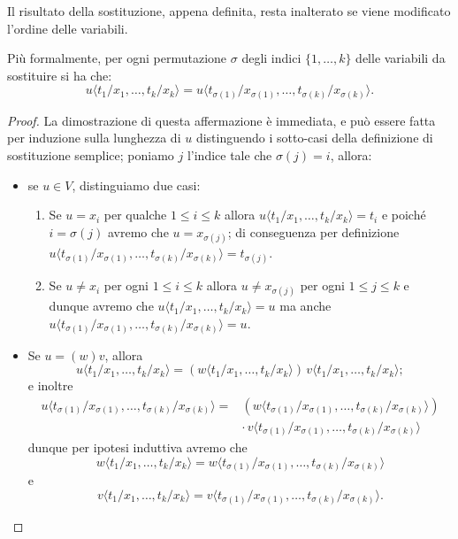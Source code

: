 \begin{rema}
Il risultato della sostituzione, appena definita, resta inalterato se viene modificato l'ordine delle variabili.
\end{rema}

Più formalmente, per ogni permutazione $\sigma$ degli indici $\{1,\dots,k\}$ delle variabili da sostituire si ha che:
\[
u\langle t_1/x_1,\dots,t_k/x_k\rangle=u\langle t_{\sigma(1)}/x_{\sigma(1)},\dots,t_{\sigma(k)}/x_{\sigma(k)}\rangle.
\]

\begin{proof}
La dimostrazione di questa affermazione è immediata, e può essere fatta per induzione sulla lunghezza di $u$ distinguendo i sotto-casi della definizione di sostituzione semplice; poniamo $j$ l'indice tale che $\sigma(j)=i$, allora:
\begin{itemize}
    \item se $u\in V$, distinguiamo due casi:
    \begin{enumerate}
        \item[i)] Se $u=x_i$ per qualche $1\le i\le k$ allora $u\langle t_1/x_1,\dots,t_k/x_k\rangle=t_i$ e poiché $i=\sigma(j)$ avremo che $u=x_{\sigma(j)}$; di conseguenza per definizione $u\langle t_{\sigma(1)}/x_{\sigma(1)},\dots,t_{\sigma(k)}/x_{\sigma(k)}\rangle=t_{\sigma(j)}$.
        \item[ii)] Se $u\neq x_i$ per ogni $1\le i\le k$ allora $u\neq x_{\sigma(j)}$ per ogni $1\le j\le k$ e dunque avremo che $u\langle t_1/x_1,\dots,t_k/x_k\rangle=u$ ma anche $u\langle t_{\sigma(1)}/x_{\sigma(1)},\dots,t_{\sigma(k)}/x_{\sigma(k)}\rangle=u$.
    \end{enumerate}
    \item Se $u=(w)v$, allora
    \[
    u\langle t_1/x_1,\dots,t_k/x_k\rangle=(w\langle t_1/x_1,\dots,t_k/x_k\rangle)\,v\langle t_1/x_1,\dots,t_k/x_k\rangle;
    \]
    e inoltre
    \begin{align*}
    u\langle t_{\sigma(1)}/x_{\sigma(1)},\dots,t_{\sigma(k)}/x_{\sigma(k)}\rangle={}&(w\langle t_{\sigma(1)}/x_{\sigma(1)},\dots,t_{\sigma(k)}/x_{\sigma(k)}\rangle)\\
    &\cdot\,v\langle t_{\sigma(1)}/x_{\sigma(1)},\dots,t_{\sigma(k)}/x_{\sigma(k)}\rangle
    \end{align*}
    dunque per ipotesi induttiva avremo che
    \[
    w\langle t_1/x_1,\dots,t_k/x_k\rangle=w\langle t_{\sigma(1)}/x_{\sigma(1)},\dots,t_{\sigma(k)}/x_{\sigma(k)}\rangle
    \]
    e
    \[
    v\langle t_1/x_1,\dots,t_k/x_k\rangle=v\langle t_{\sigma(1)}/x_{\sigma(1)},\dots,t_{\sigma(k)}/x_{\sigma(k)}\rangle.
\]
\end{itemize}
\end{proof}
